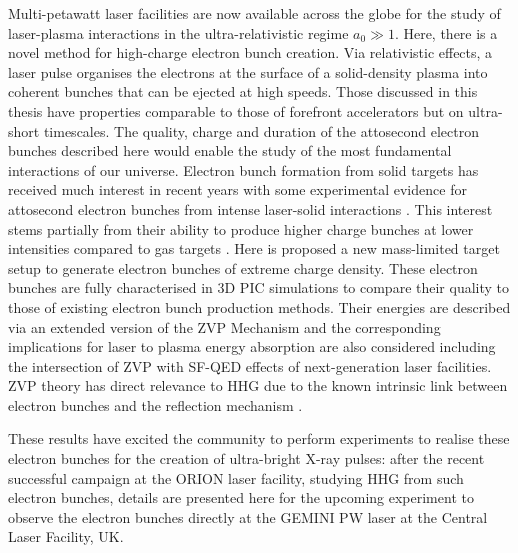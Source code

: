 Multi-petawatt laser facilities are now available across the globe for the study of laser-plasma interactions in the ultra-relativistic regime $a_0 \gg 1$. Here, there is a novel method for high-charge electron bunch creation. Via relativistic effects, a laser pulse organises the electrons at the surface of a solid-density plasma into coherent bunches that can be ejected at high speeds. Those discussed in this thesis have properties comparable to those of forefront accelerators but on ultra-short timescales. The quality, charge and duration of the attosecond electron bunches described here would enable the study of the most fundamental interactions of our universe. Electron bunch formation from solid targets has received much interest in recent years \cite{kulaginCharacteristicsRelativisticElectron2009, huEnhancedDenseAttosecond2015, cantonoExtensiveStudyElectron2018, serebryakovNearsurfaceElectronAcceleration2017, zhangGiantIsolatedAttosecond2020, hornyGenerationSingleAttosecond2021, ongElectronTransportNanowire2021, kulaginSubrelativisticInfraredTerahertz2021} with some experimental evidence for attosecond electron bunches from intense laser-solid interactions \cite{linIsolatedAttosecondElectron2020, cardenasSubcycleDynamicsRelativistic2019, thevenetVacuumLaserAcceleration2016}. This interest stems partially from their ability to produce higher charge bunches at lower intensities compared to gas targets \cite{linIsolatedAttosecondElectron2020}. Here is proposed a new mass-limited target setup to generate electron bunches of extreme charge density. These electron bunches are fully characterised in 3D \ac{PIC} simulations to compare their quality to those of existing electron bunch production methods. Their energies are described via an extended version of the \ac{ZVP} Mechanism and the corresponding implications for laser to plasma energy absorption are also considered including the intersection of \ac{ZVP} with \ac{SF-QED} effects of next-generation laser facilities. \ac{ZVP} theory has direct relevance to \ac{HHG} due to the known intrinsic link between electron bunches and the reflection mechanism \cite{cousensElectronTrajectoriesAssociated2020, savinAttosecondscaleAbsorptionExtreme2017}.

These results have excited the community to perform experiments to realise these electron bunches for the creation of ultra-bright X-ray pulses: after the recent successful campaign at the ORION laser facility, studying \ac{HHG} from such electron bunches, details are presented here for the upcoming experiment to observe the electron bunches directly at the GEMINI PW laser at the Central Laser Facility, UK.

